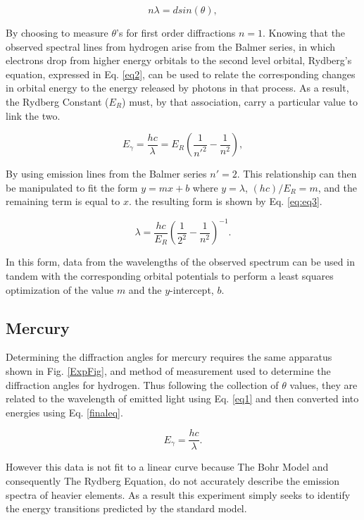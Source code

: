 \documentclass[prb,preprint]{revtex4-1}
\begin{document}
\begin{equation}
n \lambda = d sin(\theta),
\label{eq1}
\end{equation}

By choosing to measure $\theta$'s for first order diffractions $n=1$. Knowing that the observed spectral lines from hydrogen arise from the Balmer series, in which electrons drop from higher energy orbitals to the second level orbital, Rydberg's equation, expressed in Eq. \eqref{eq2}, can be used to relate the corresponding changes in orbital energy to the energy released by photons in that process. As a result, the Rydberg Constant ($E_R$) must, by that association, carry a particular value to link the two.

\begin{equation}
E_{\gamma}=\frac{hc}{\lambda}=E_R\left(\frac{1}{n'^2}-\frac{1}{n^2}\right) ,
\label{eq2}
\end{equation}

By using emission lines from the Balmer series $n'=2$. This relationship can then be manipulated to fit the form $y=mx+b$ where $y=\lambda$, $(hc)/E_R=m$, and the remaining term is equal to $x$. the resulting form is shown by Eq. \eqref{eq:eq3}.

\begin{equation}
\lambda=\frac{hc}{E_R}\left(\frac{1}{2^2}-\frac{1}{n^2}\right)^{-1}.
\label{eq:eq3}
\end{equation}

In this form, data from the wavelengths of the observed spectrum can be used in tandem with the corresponding orbital potentials to perform a least squares optimization of the value $m$ and the $y$-intercept, $b$.

\subsection{Mercury}

Determining the diffraction angles for mercury requires the same apparatus shown in Fig. \ref{ExpFig}, and method of measurement used to determine the diffraction angles for hydrogen. Thus following the collection of $\theta$ values, they are related to the wavelength of emitted light using Eq. \eqref{eq1} and then converted into energies using Eq. \eqref{finaleq}.

\begin{equation}
E_{\gamma}=\frac{hc}{\lambda}.
\label{finaleq}
\end{equation}

However this data is not fit to a linear curve because The Bohr Model and consequently The Rydberg Equation, do not accurately describe the emission spectra of heavier elements. As a result this experiment simply seeks to identify the energy transitions predicted by the standard model.
\newpage
\end{document}
